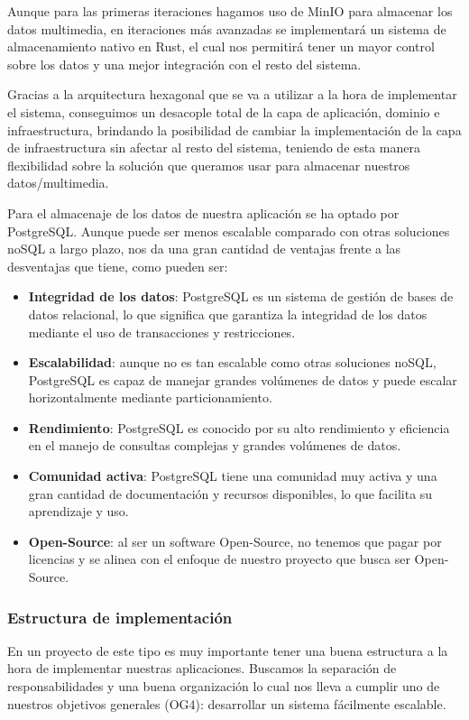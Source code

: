Aunque para las primeras iteraciones hagamos uso de MinIO para almacenar los datos multimedia, en iteraciones más avanzadas se implementará un sistema de almacenamiento nativo en Rust, el cual nos permitirá tener un mayor control sobre los datos y una mejor integración con el resto del sistema.

Gracias a la arquitectura hexagonal que se va a utilizar a la hora de implementar el sistema, conseguimos un desacople total de la capa de aplicación, dominio e infraestructura, brindando la posibilidad de cambiar la implementación de la capa de infraestructura sin afectar al resto del sistema, teniendo de esta manera flexibilidad sobre la solución que queramos usar para almacenar nuestros datos/multimedia.

Para el almacenaje de los datos de nuestra aplicación se ha optado por PostgreSQL.
Aunque puede ser menos escalable comparado con otras soluciones noSQL a largo plazo, nos da una gran cantidad de ventajas frente a las desventajas que tiene, como pueden ser:
\begin{itemize}
    \item \textbf{Integridad de los datos}: PostgreSQL es un sistema de gestión de bases de datos relacional, lo que significa que garantiza la integridad de los datos mediante el uso de transacciones y restricciones.
    \item \textbf{Escalabilidad}: aunque no es tan escalable como otras soluciones noSQL, PostgreSQL es capaz de manejar grandes volúmenes de datos y puede escalar horizontalmente mediante particionamiento.
    \item \textbf{Rendimiento}: PostgreSQL es conocido por su alto rendimiento y eficiencia en el manejo de consultas complejas y grandes volúmenes de datos.
    \item \textbf{Comunidad activa}: PostgreSQL tiene una comunidad muy activa y una gran cantidad de documentación y recursos disponibles, lo que facilita su aprendizaje y uso.
    \item \textbf{Open-Source}: al ser un software Open-Source, no tenemos que pagar por licencias y se alinea con el enfoque de nuestro proyecto que busca ser Open-Source.
\end{itemize}

\subsubsection{Estructura de implementación}
En un proyecto de este tipo es muy importante tener una buena estructura a la hora de implementar nuestras aplicaciones.
Buscamos la separación de responsabilidades y una buena organización lo cual nos lleva a cumplir uno de nuestros objetivos generales (OG4): desarrollar un sistema fácilmente escalable.


